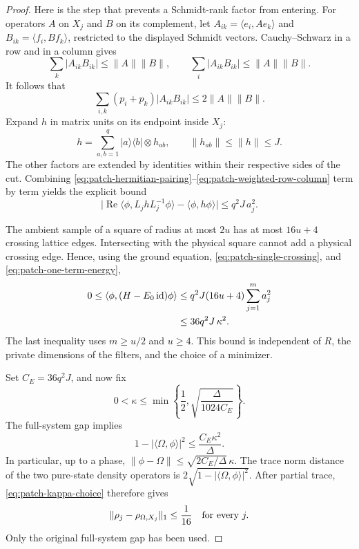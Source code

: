 \documentclass[11pt]{article}
\numberwithin{equation}{section}
\theoremstyle{definition}
\theoremstyle{remark}
\DeclareMathOperator{\id}{id}
\newcommand{\norm}[1]{\lVert #1\rVert}
\newcommand{\abs}[1]{\lvert #1\rvert}
\begin{document}
\begin{proof}
Here is the step that prevents a Schmidt-rank factor from entering.
For operators \(A\) on \(X_j\) and \(B\) on its complement,
let \(A_{ik}=\langle e_i,Ae_k\rangle\) and
\(B_{ik}=\langle f_i,Bf_k\rangle\), restricted to the displayed
Schmidt vectors.  Cauchy--Schwarz in a row and in a column gives
\[
 \sum_k\abs{A_{ik}B_{ik}}\leq\norm{A}\norm{B},
 \qquad
 \sum_i\abs{A_{ik}B_{ik}}\leq\norm{A}\norm{B}.
\]
It follows that
\begin{equation}
 \sum_{i,k}(p_i+p_k)\abs{A_{ik}B_{ik}}
       \leq2\norm{A}\norm{B}.
 \label{eq:patch-weighted-row-column}
\end{equation}
Expand \(h\) in matrix units on its endpoint inside \(X_j\):
\[
 h=\sum_{a,b=1}^q
       \lvert a\rangle\langle b\rvert\otimes h_{ab},
 \qquad \norm{h_{ab}}\leq\norm{h}\leq J.
\]
The other factors are extended by identities within their respective
sides of the cut.  Combining
\eqref{eq:patch-hermitian-pairing}--\eqref{eq:patch-weighted-row-column}
term by term yields the explicit bound
\begin{equation}
 \abs{\operatorname{Re}\langle\phi,L_j h L_j^{-1}\phi\rangle
                  -\langle\phi,h\phi\rangle}
       \leq q^2J\,a_j^2.
 \label{eq:patch-one-term-energy}
\end{equation}

The ambient sample of a square of radius at most \(2u\) has at most
\(16u+4\) crossing lattice edges.  Intersecting with the physical
square cannot add a physical crossing edge.  Hence, using the
ground equation, \eqref{eq:patch-single-crossing}, and
\eqref{eq:patch-one-term-energy},
\begin{align}
 0\leq\langle\phi,(H-E_0\id)\phi\rangle
 &\leq q^2J(16u+4)\sum_{j=1}^m a_j^2 \notag\\
 &\leq 36q^2J\,\kappa^2.
 \label{eq:patch-energy-bound}
\end{align}
The last inequality uses \(m\geq u/2\) and \(u\geq4\).
This bound is independent of \(R\), the private dimensions of the
filters, and the choice of a minimizer.

Set \(C_E=36q^2J\), and now fix
\begin{equation}
 0<\kappa\leq
 \min\left\{\frac12,\sqrt{\frac{\Delta}{1024C_E}}\right\}.
 \label{eq:patch-kappa-choice}
\end{equation}
The full-system gap implies
\[
 1-\abs{\langle\Omega,\phi\rangle}^2
       \leq \frac{C_E\kappa^2}{\Delta}.
\]
In particular, up to a phase,
\(\norm{\phi-\Omega}\leq
\sqrt{2C_E/\Delta}\,\kappa\).
The trace norm distance of the two pure-state density operators is
\(2\sqrt{1-\abs{\langle\Omega,\phi\rangle}^2}\).
After partial trace, \eqref{eq:patch-kappa-choice} therefore gives
\begin{equation}
 \norm{\rho_j-\rho_{\Omega,X_j}}_1\leq\frac1{16}
 \quad\hbox{for every }j.
 \label{eq:patch-marginal-closeness}
\end{equation}
Only the original full-system gap has been used.


\end{proof}
\end{document}
